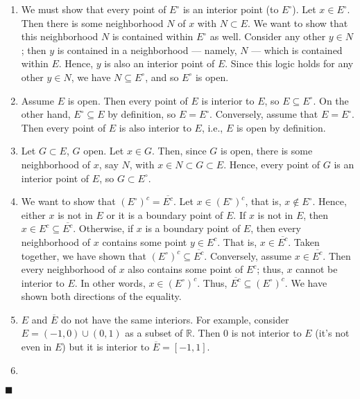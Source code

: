 \documentclass[12pt]{article}
\renewcommand{\qed}{\hfill$\blacksquare$}
\renewenvironment{proof}{\begin{addmargin}[1em]{0em}\begin{newproof}}{\end{newproof}\end{addmargin}\qed}
\begin{document}
\begin{proof}
\begin{enumerate}[label=(\alph*)]
	\item We must show that every point of $E^{\circ}$ is an interior point (to $E^{\circ}$). Let $x\in E^{\circ}$. Then there is some neighborhood $N$ of $x$ with $N\subset E$. We want to show that this neighborhood $N$ is contained within $E^{\circ}$ as well. Consider any other $y\in N$; then $y$ is contained in a neighborhood --- namely, $N$ --- which is contained within $E$. Hence, $y$ is also an interior point of $E$. Since this logic holds for any other $y\in N$, we have $N \subseteq E^{\circ}$, and so $E^{\circ}$ is open.
	
	\item Assume $E$ is open. Then every point of $E$ is interior to $E$, so $E \subseteq E^{\circ}$. On the other hand, $E^{\circ} \subseteq E$ by definition, so $E=E^{\circ}$. Conversely, assume that $E=E^{\circ}$. Then every point of $E$ is also interior to $E$, i.e., $E$ is open by definition.
	
	\item Let $G\subset E$, $G$ open. Let $x \in G$. Then, since $G$ is open, there is some neighborhood of $x$, say $N$, with $x\in N \subset G \subset E$. Hence, every point of $G$ is an interior point of $E$, so $G\subset E^{\circ}$.
	
	\item We want to show that $\left(E^{\circ}\right)^c = \overline{E^c}$. Let $x \in \left(E^{\circ}\right)^c$, that is, $x\notin E^{\circ}$. Hence, either $x$ is not in $E$ or it is a boundary point of $E$. If $x$ is not in $E$, then $x\in E^c \subseteq \overline{E^c}$. Otherwise, if $x$ is a boundary point of $E$, then every neighborhood of $x$ contains some point $y \in E^c$. That is, $x \in \overline{E^c}$. Taken together, we have shown that $\left(E^{\circ}\right)^c \subseteq \overline{E^c}$. 
	Conversely, assume $x\in \overline{E^c}$. Then every neighborhood of $x$ also contains some point of $E^c$; thus, $x$ cannot be interior to $E$. In other words, $x\in \left(E^{\circ}\right)^{c}$. Thus, $\overline{E^c} \subseteq \left(E^{\circ}\right)^{c}$. 
	We have shown both directions of the equality.
	
	\item $E$ and $\overline{E}$ do not have the same interiors. For example, consider $E = \left(-1,0\right)\cup\left(0,1\right)$ as a subset of $\mathbb{R}$. Then $0$ is not interior to $E$ (it's not even in $E$) but it is interior to $\overline{E}=\left[-1,1\right]$.
	
	\item 
	
\end{enumerate}
\end{proof}
\end{document}

